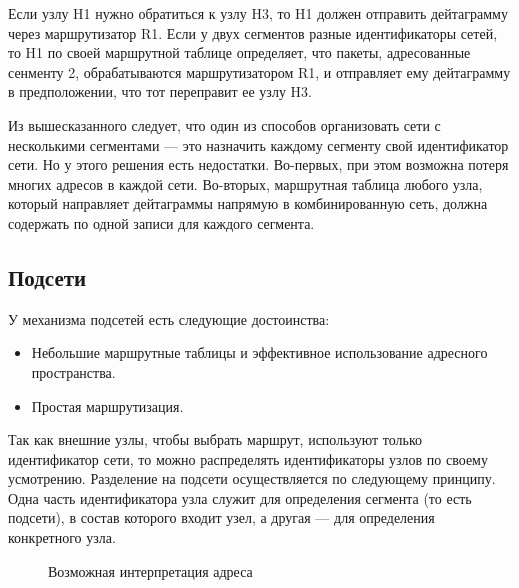 Если узлу H1 нужно обратиться к узлу H3, то H1 должен отправить дейтаграмму через маршрутизатор R1. Если у двух сегментов разные идентификаторы сетей, то H1 по своей маршрутной таблице определяет, что пакеты, адресованные сенменту 2, обрабатываются маршрутизатором R1, и отправляет ему дейтаграмму в предположении, что тот переправит ее узлу H3.

Из вышесказанного следует, что один из способов организовать сети с несколькими сегментами --- это назначить каждому сегменту свой идентификатор сети. Но у этого решения есть недостатки. Во-первых, при этом возможна потеря многих адресов в каждой сети. Во-вторых, маршрутная таблица любого узла, который направляет дейтаграммы напрямую в комбинированную сеть, должна содержать по одной записи для каждого сегмента.

\subsection{Подсети}
У механизма подсетей есть следующие достоинства:
\begin{itemize}
  \item Небольшие маршрутные таблицы и эффективное использование адресного пространства.
  \item Простая маршрутизация.
\end{itemize}

Так как внешние узлы, чтобы выбрать маршрут, используют только идентификатор сети, то можно распределять идентификаторы узлов по своему усмотрению. Разделение на подсети осуществляется по следующему принципу. Одна часть идентификатора узла служит для определения сегмента (то есть подсети), в состав которого входит узел, а другая --- для определения конкретного узла.

\noindent
\begin{figure}[h!]
  \centering
  \caption{Возможная интерпретация адреса}
\end{figure}

